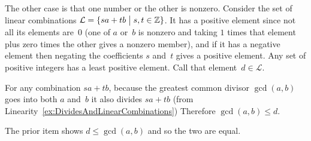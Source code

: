 \documentclass{test}  %
\begin{document}
\begin{bezoutproof}
\begin{problem}
\begin{exes}
\begin{answer}
  The other case is that one number or the other is nonzero.
  Consider the set of linear combinations 
  $\mathcal{L}=\{sa+tb \bigm| s,t\in\mathbb{Z}\}$.
  It has a positive element since not all its elements are~$0$
  (one of $a$ or~$b$ is nonzero and taking $1$ times that element
  plus zero times the other gives a nonzero member), and if it has a 
  negative element then negating the coefficients $s$ and~$t$ gives 
  a positive element.
  Any set of positive integers has a least positive element.
  Call that element~$d\in\mathcal{L}$.

  For any combination $sa+tb$, because the greatest common divisor
  $\gcd(a,b)$ goes into both $a$ and~$b$ it also divides $sa+tb$  
  (from Linearity~\ref{ex:DividesAndLinearCombinations})
  Therefore $\gcd(a,b)\leq d$.

  The prior item shows $d\leq\gcd(a,b)$ and so the two are equal. 






\end{answer}
\end{exes}
\end{problem}
\end{bezoutproof}
\end{document}
